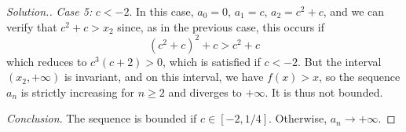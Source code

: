 \begin{proof}[Solution.]
\emph{Case 5:} $c < -2$.
In this case, $a_0=0$, $a_1=c$, $a_2=c^2+c$, and we can verify that
$c^2+c > x_2$ since, as in the previous case, this occurs if
\[
   (c^2+c)^2 + c > c^2+c
\]
which reduces to $c^3(c+2)>0$, which is satisfied if $c<-2$.
But the interval $(x_2,+\infty)$ is invariant, and on this interval,
we have $f(x)>x$, so the sequence $a_n$ is strictly increasing for $n\ge 2$
and diverges to $+\infty$. It is thus not bounded.

\emph{Conclusion}. The sequence is bounded if $c\in[-2,1/4]$.
Otherwise, $a_n\to +\infty$.

\end{proof}